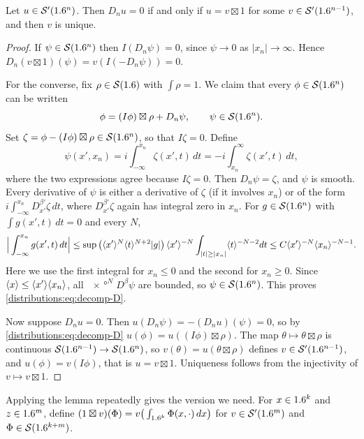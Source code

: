 \begin{lemma}\label{distributions:lem:Dju}
Let $u\in\mathcal{S}'(1.6^n)$. Then $D_nu=0$ if and only if $u=v\boxtimes1$ for some
$v\in\mathcal{S}'(1.6^{n-1})$, and then $v$ is unique.
\end{lemma}
\begin{proof}
If $\psi\in\mathcal{S}(1.6^n)$ then $I(D_n\psi)=0$, since $\psi\to0$ as $|x_n|\to\infty$. Hence
$D_n(v\boxtimes1)(\psi)=v(I(-D_n\psi))=0$.

For the converse, fix $\rho\in\mathcal{S}(1.6)$ with $\int\rho=1$. We claim that every
$\phi\in\mathcal{S}(1.6^n)$ can be written
\begin{equation}\label{distributions:eq:decomp-D}
  \phi=(I\phi)\boxtimes\rho+D_n\psi,\qquad\psi\in\mathcal{S}(1.6^n).
\end{equation}
Set $\zeta=\phi-(I\phi)\boxtimes\rho\in\mathcal{S}(1.6^n)$, so that $I\zeta=0$. Define
\[
  \psi(x',x_n)=i\int_{-\infty}^{x_n}\zeta(x',t)\,dt=-i\int_{x_n}^{\infty}\zeta(x',t)\,dt,
\]
where the two expressions agree because $I\zeta=0$. Then $D_n\psi=\zeta$, and $\psi$ is
smooth. Every derivative of $\psi$ is either a derivative of $\zeta$ (if it involves
$x_n$) or of the form $i\int_{-\infty}^{x_n}D^{\beta'}_{x'}\zeta\,dt$, where
$D^{\beta'}_{x'}\zeta$ again has integral zero in $x_n$. For $g\in\mathcal{S}(1.6^n)$ with
$\int g(x',t)\,dt=0$ and every $N$,
\[
  \Big|\int_{-\infty}^{x_n}g(x',t)\,dt\Big|\le
  \sup\big(\langle x'\rangle^N\langle t\rangle^{N+2}|g|\big)\,\langle x'\rangle^{-N}\int_{|t|\ge|x_n|}\langle t\rangle^{-N-2}dt
  \le C\langle x'\rangle^{-N}\langle x_n\rangle^{-N-1}.
\]
Here we use the first integral for $x_n\le0$ and the second for $x_n\ge0$. Since
$\langle x\rangle\le\langle x'\rangle\langle x_n\rangle$, all $\ang{x}^ND^\beta\psi$ are bounded, so
$\psi\in\mathcal{S}(1.6^n)$. This proves \eqref{distributions:eq:decomp-D}.

Now suppose $D_nu=0$. Then $u(D_n\psi)=-(D_nu)(\psi)=0$, so by
\eqref{distributions:eq:decomp-D}
$u(\phi)=u((I\phi)\boxtimes\rho)$. The map $\theta\mapsto\theta\boxtimes\rho$ is
continuous $\mathcal{S}(1.6^{n-1})\to\mathcal{S}(1.6^n)$, so $v(\theta)=u(\theta\boxtimes\rho)$ defines
$v\in\mathcal{S}'(1.6^{n-1})$, and $u(\phi)=v(I\phi)$, that is $u=v\boxtimes1$. Uniqueness
follows from the injectivity of $v\mapsto v\boxtimes1$.
\end{proof}

Applying the lemma repeatedly gives the version we need. For $x\in1.6^k$ and
$z\in1.6^m$, define $(1\boxtimes v)(\Phi)=v\big(\int_{1.6^k}\Phi(x,\cdot)\,dx\big)$ for
$v\in\mathcal{S}'(1.6^m)$ and $\Phi\in\mathcal{S}(1.6^{k+m})$.

